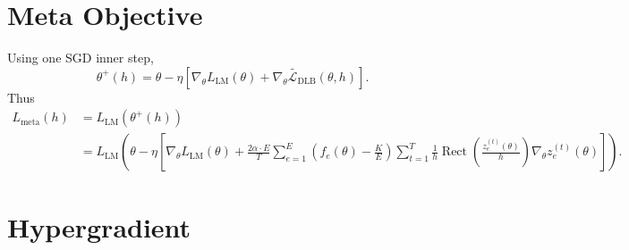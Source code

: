 \documentclass[11pt]{article}
\newcommand{\totalexperts}{E}
\newcommand{\activeexperts}{K}
\newcommand{\batchsize}{T}
\newcommand{\assignmentfraction}{f}
\newcommand{\modelparams}{\theta}
\newcommand{\lbcoef}{\alpha}
\newcommand{\bandwidth}{h}
\newcommand{\rect}{\operatorname{Rect}}
\newcommand{\dlbloss}{\mathcal{L}_{\mathrm{DLB}}}
\begin{document}
\section{Meta Objective}

Using one SGD inner step,
\[
  \modelparams^+(\bandwidth)
  =
  \modelparams
  -
  \eta
  \left[
    \nabla_{\modelparams} L_{\mathrm{LM}}(\modelparams)
    +
    \widetilde{\nabla_{\modelparams}\dlbloss}
    (\modelparams,\bandwidth)
  \right].
\]
Thus
\[
\begin{aligned}
  L_{\mathrm{meta}}(\bandwidth)
  &=
  L_{\mathrm{LM}}(\modelparams^+(\bandwidth)) \\
  &=
  L_{\mathrm{LM}}
  \left(
    \modelparams
    -
    \eta
    \left[
      \nabla_{\modelparams} L_{\mathrm{LM}}(\modelparams)
      +
      \frac{2\lbcoef \cdot \totalexperts}{\batchsize}
      \sum_{e=1}^{\totalexperts}
      \left(
        \assignmentfraction_e(\modelparams)
        -
        \frac{\activeexperts}{\totalexperts}
      \right)
      \sum_{t=1}^{\batchsize}
      \frac{1}{\bandwidth}
      \rect\!\left(
        \frac{z_e^{(t)}(\modelparams)}{\bandwidth}
      \right)
      \nabla_{\modelparams} z_e^{(t)}(\modelparams)
    \right]
  \right).
\end{aligned}
\]

\section{Hypergradient}
\end{document}
